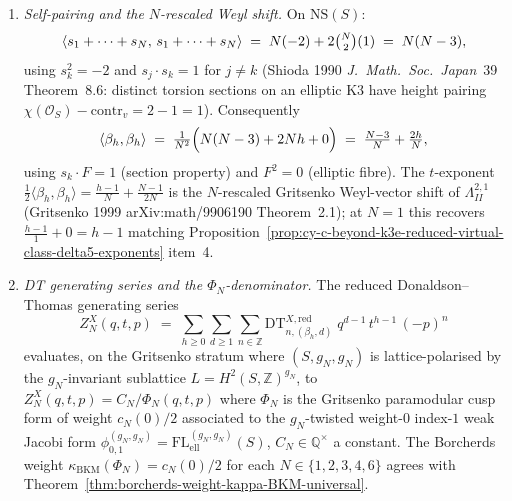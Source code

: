 \begin{proposition}
\begin{enumerate}
$F$ is $g_N$-invariant because $g_N$ preserves the elliptic
fibration $\pi$ (Nikulin 1979 \S 4). Hence
$\sum_k s_k + hF\in\mathrm{NS}(S)^{g_N}$, and
$\beta_h = \tfrac1N(\sum_k s_k + hF)$ descends to
$\mathrm{NS}(X)_{\mathbb Q}$. The DT moduli problem on $X$ is
well-posed because
$\mathrm{Hilb}^n(X,\beta_h) = \mathrm{Hilb}^n(S\times E,\sum_k s_k+hF)^{\mathbb Z/N}$
is the fixed-point scheme under the free quotient (Bryan--Oberdieck
2019 arXiv:1807.01379 Theorem~2).
\item \emph{Self-pairing and the $N$-rescaled Weyl shift.}
On $\mathrm{NS}(S)$:
\[
 \langle s_1+\cdots+s_N,\, s_1+\cdots+s_N\rangle
 \;=\; N(-2) + 2\tbinom{N}{2}(1) \;=\; N(N-3),
\]
using $s_k^2=-2$ and $s_j\cdot s_k=1$ for $j\ne k$
(Shioda 1990 \emph{J.\ Math.\ Soc.\ Japan}~39 Theorem~8.6:
distinct torsion sections on an elliptic K3 have height pairing
$\chi(\mathcal O_S) - \mathrm{contr}_v = 2 - 1 = 1$). Consequently
\[
 \langle\beta_h,\beta_h\rangle
 \;=\; \tfrac{1}{N^2}\Bigl(N(N-3) + 2Nh + 0\Bigr)
 \;=\; \tfrac{N-3}{N} + \tfrac{2h}{N},
\]
using $s_k\cdot F=1$ (section property) and $F^2=0$ (elliptic
fibre). The $t$-exponent
$\tfrac12\langle\beta_h,\beta_h\rangle
 = \tfrac{h-1}{N} + \tfrac{N-1}{2N}$
is the $N$-rescaled Gritsenko Weyl-vector shift of
$\Lambda^{2,1}_{II}$ (Gritsenko 1999 arXiv:math/9906190 Theorem~2.1);
at $N=1$ this recovers $\tfrac{h-1}{1}+0 = h-1$ matching
Proposition~\ref{prop:cy-c-beyond-k3e-reduced-virtual-class-delta5-exponents}
item~4.
\item \emph{DT generating series and the $\Phi_N$-denominator.}
The reduced Donaldson--Thomas generating series
\[
 Z^X_N(q,t,p)
 \;=\; \sum_{h\ge 0}\sum_{d\ge 1}\sum_{n\in\mathbb Z}
 \mathrm{DT}^{X,\mathrm{red}}_{n,(\beta_h,d)}\;
 q^{d-1}\, t^{h-1}\, (-p)^n
\]
evaluates, on the Gritsenko stratum where $(S,g_N,g_N)$ is
lattice-polarised by the $g_N$-invariant sublattice
$L=H^2(S,\mathbb Z)^{g_N}$, to
$Z^X_N(q,t,p) = C_N/\Phi_N(q,t,p)$
where $\Phi_N$ is the Gritsenko paramodular cusp form of weight
$c_N(0)/2$ associated to the $g_N$-twisted weight-$0$ index-$1$
weak Jacobi form
$\phi_{0,1}^{(g_N,g_N)} = \mathrm{FL}^{(g_N,g_N)}_{\mathrm{ell}}(S)$,
$C_N\in\mathbb Q^\times$ a constant. The Borcherds weight
$\kappa_{\mathrm{BKM}}(\Phi_N) = c_N(0)/2$ for each
$N\in\{1,2,3,4,6\}$ agrees with
\cite{VolI}
Theorem~\ref{thm:borcherds-weight-kappa-BKM-universal}.
\end{enumerate}
\end{proposition}

